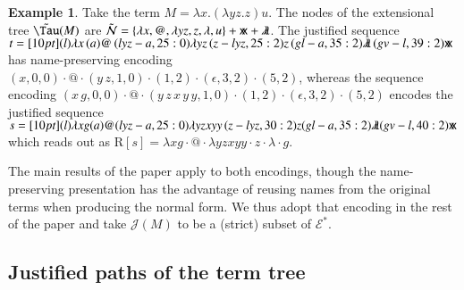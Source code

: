 \documentclass{elsarticle}
\theoremstyle{plain}
\theoremstyle{definition}
\newtheorem{example}{Example}[section]
\newcommand\Nodes{\mathcal{N}}%
\newcommand{\ghostlmd}{{\lambda\mkern-7mu \lambda}}
\newcommand{\ghostvar}{\mathsf{x\mkern-5mu x}}
\newcommand\ExtendedNodes{\tilde{\Nodes}}
\def\readout{\mathrm{R}} %
\def\nameencoding{\mathcal{E}} %
\newcommand{\exttree}{\tilde{\Tau}} %
\def\justseqset{\mathcal{J}}
\begin{document}
\begin{example}
\label{examp:ghost_materialization}
    Take the term $M = \lambda x. (\lambda y z.z) u$. The nodes of the extensional tree $\exttree(M)$ are $\ExtendedNodes = \{ \lambda x, @, \lambda y z, z, \lambda, u \} + \ghostvar + \ghostlmd$. The justified sequence
    $t = \Pstr[10pt]{
        (l){\lambda x} \, (a)@ \, (lyz-a,25:0){\lambda y z} \, (z-lyz,25:2)z \, (gl-a,35:2)\ghostlmd \, (gv-l,39:2)\ghostvar }
    $
    has name-preserving encoding
    $(x ,0,0)\cdot
    @\cdot
    (y\, z, 1,0)\cdot
    (1,2)\cdot
    (\epsilon,3,2)\cdot
    (5,2)$, whereas
    the sequence encoding
    $ (x\, g, 0, 0)\cdot
    @\cdot
    (y\, z\, x\, y\, y, 1,0)\cdot
    (1,2)\cdot
    (\epsilon,3,2) \cdot
    (5,2)$ encodes the justified sequence
    $s= \Pstr[10pt]{
        (l){\lambda x g}
         (a)@
         (lyz-a,25:0){\lambda y z x y y}
         \,(z-lyz,30:2)z
         (gl-a,35:2)\ghostlmd
         (gv-l,40:2)\ghostvar }
    $ which reads out as $\readout[s]= \lambda x g \cdot @ \cdot \lambda y z x y y \cdot z \cdot \lambda \cdot g$.
\end{example}


The main results of the paper apply to both encodings, though
the name-preserving presentation has the advantage of reusing names from the original terms when producing the normal form.
We thus adopt that encoding in the rest of the paper and take $\justseqset(M)$ to be a (strict) subset of $\nameencoding^*$.
%

\subsection{Justified paths of the term tree}
\end{document}
